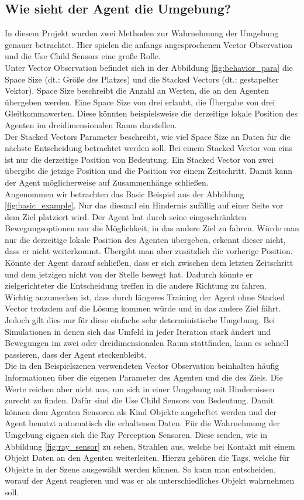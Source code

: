 \subsection{Wie sieht der Agent die Umgebung?}
\label{sensorik_agent}
In diesem Projekt wurden zwei Methoden zur Wahrnehmung der Umgebung genauer betrachtet. Hier spielen die anfangs angesprochenen Vector Observation und die Use Child Sensors eine große Rolle. 
\\
Unter Vector Observation befindet sich in der Abbildung \ref{fig:behavior_para} die Space Size (dt.: Größe des Platzes) und die Stacked Vectors (dt.: gestapelter Vektor). Space Size beschreibt die Anzahl an Werten, die an den Agenten übergeben werden. Eine Space Size von drei erlaubt, die Übergabe von drei Gleitkommawerten. Diese könnten beispielsweise die derzeitige lokale Position des Agenten im dreidimensionalen Raum darstellen. 
\\
Der Stacked Vectors Parameter beschreibt, wie viel Space Size an Daten für die nächste Entscheidung betrachtet werden soll. Bei einem Stacked Vector von eins ist nur die derzeitige Position von Bedeutung. Ein Stacked Vector von zwei übergibt die jetzige Position und die Position vor einem Zeitschritt. Damit kann der Agent möglicherweise auf Zusammenhänge schließen. 
\\
Angenommen wir betrachten das Basic Beispiel aus der Abbildung \ref{fig:basic_example}. Nur das diesmal ein Hindernis zufällig auf einer Seite vor dem Ziel platziert wird. Der Agent hat durch seine eingeschränkten Bewegungsoptionen nur die Möglichkeit, in das andere Ziel zu fahren. Würde man nur die derzeitige lokale Position des Agenten übergeben, erkennt dieser nicht, dass er nicht weiterkommt. Übergibt man aber zusätzlich die vorherige Position. Könnte der Agent darauf schließen, dass er sich zwischen dem letzten Zeitschritt und dem jetzigen nicht von der Stelle bewegt hat. Dadurch könnte er zielgerichteter die Entscheidung treffen in die andere Richtung zu fahren.
\\
Wichtig anzumerken ist, dass durch längeres Training der Agent ohne Stacked Vector trotzdem auf die Lösung kommen würde und in das andere Ziel fährt. Jedoch gilt dies nur für diese einfache sehr deterministische Umgebung. Bei Simulationen in denen sich das Umfeld in jeder Iteration stark ändert und Bewegungen im zwei oder dreidimensionalen Raum stattfinden, kann es schnell passieren, dass der Agent steckenbleibt.
\\
Die in den Beispielszenen verwendeten Vector Observation beinhalten häufig Informationen über die eigenen Parameter des Agenten und die des Ziels. Die Werte reichen aber nicht aus, um sich in einer Umgebung mit Hindernissen zurecht zu finden. Dafür sind die Use Child Sensors von Bedeutung. Damit können dem Agenten Sensoren als Kind Objekte angeheftet werden und der Agent benutzt automatisch die erhaltenen Daten. Für die Wahrnehmung der Umgebung eignen sich die Ray Perception Sensoren. Diese senden, wie in Abbildung \ref{fig:ray_sensor} zu sehen, Strahlen aus, welche bei Kontakt mit einem Objekt Daten an den Agenten weiterleiten. Hierzu gehören die Tags, welche für Objekte in der Szene ausgewählt werden können. So kann man entscheiden, worauf der Agent reagieren und was er als unterschiedliches Objekt wahrnehmen soll. 
